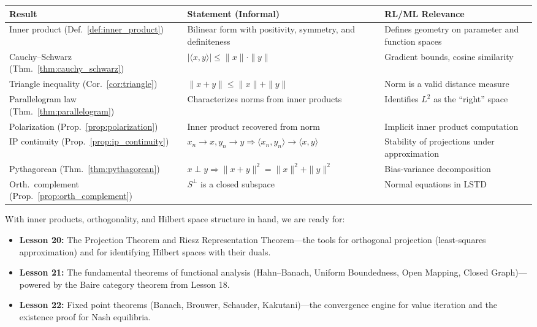 \documentclass[11pt,a4paper]{article}
\begin{document}
\begin{center}
\renewcommand{\arraystretch}{1.4}
\begin{tabular}{@{}p{4cm}p{5.8cm}p{4.5cm}@{}}
\toprule
\textbf{Result} & \textbf{Statement (Informal)} & \textbf{RL/ML Relevance} \\
\midrule
Inner product (Def.~\ref{def:inner_product})
  & Bilinear form with positivity, symmetry, and definiteness
  & Defines geometry on parameter and function spaces \\
Cauchy--Schwarz (Thm.~\ref{thm:cauchy_schwarz})
  & $|\langle x, y \rangle| \le \|x\| \cdot \|y\|$
  & Gradient bounds, cosine similarity \\
Triangle inequality (Cor.~\ref{cor:triangle})
  & $\|x + y\| \le \|x\| + \|y\|$
  & Norm is a valid distance measure \\
Parallelogram law (Thm.~\ref{thm:parallelogram})
  & Characterizes norms from inner products
  & Identifies $L^2$ as the ``right'' space \\
Polarization (Prop.~\ref{prop:polarization})
  & Inner product recovered from norm
  & Implicit inner product computation \\
IP continuity (Prop.~\ref{prop:ip_continuity})
  & $x_n \to x, y_n \to y \Rightarrow \langle x_n, y_n \rangle \to
    \langle x, y \rangle$
  & Stability of projections under approximation \\
Pythagorean (Thm.~\ref{thm:pythagorean})
  & $x \perp y \Rightarrow \|x + y\|^2 = \|x\|^2 + \|y\|^2$
  & Bias-variance decomposition \\
Orth.\ complement (Prop.~\ref{prop:orth_complement})
  & $S^\perp$ is a closed subspace
  & Normal equations in LSTD \\
\bottomrule
\end{tabular}
\end{center}

\bigskip

\begin{rlconnection}[title={Looking Ahead}]
With inner products, orthogonality, and Hilbert space structure in hand, we
are ready for:
\begin{itemize}[nosep]
    \item \textbf{Lesson 20:} The Projection Theorem and Riesz Representation
          Theorem---the tools for orthogonal projection (least-squares
          approximation) and for identifying Hilbert spaces with their duals.
    \item \textbf{Lesson 21:} The fundamental theorems of functional analysis
          (Hahn--Banach, Uniform Boundedness, Open Mapping, Closed
          Graph)---powered by the Baire category theorem from Lesson 18.
    \item \textbf{Lesson 22:} Fixed point theorems (Banach, Brouwer,
          Schauder, Kakutani)---the convergence engine for value iteration
          and the existence proof for Nash equilibria.
\end{itemize}
\end{rlconnection}


\end{document}
